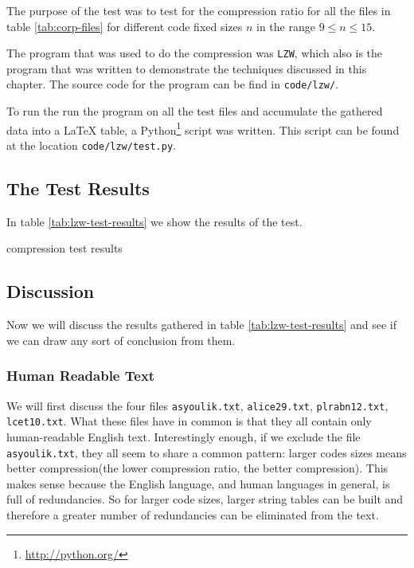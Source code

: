 The purpose of the test was to test for the compression ratio for all
the files in table \ref{tab:corp-files} for different code fixed sizes
$n$ in the range $9 \leq n \leq 15$.

The program that was used to do the compression was \verb|LZW|, which
also is the program that was written to demonstrate the techniques
discussed in this chapter. The source code for the program can be find
in \verb|code/lzw/|.

To run the run the program on all the test files and accumulate the
gathered data into a \LaTeX{} table, a Python\footnote{\url{http://python.org/}} script was written. This
script can be found at the location \verb|code/lzw/test.py|.

\subsection{The Test Results}

In table \ref{tab:lzw-test-results} we show the results of the test.

\begin{table}
  \scriptsize
  \centering
  
  \caption{\lzw compression test results}
  \label{tab:lzw-test-results}
\end{table}

\subsection{Discussion}

Now we will discuss the results gathered in table
\ref{tab:lzw-test-results} and see if we can draw any sort of
conclusion from them.

\subsubsection{Human Readable Text}

We will first discuss the four files \verb|asyoulik.txt|,
\verb|alice29.txt|, \verb|plrabn12.txt|, \verb|lcet10.txt|. What these
files have in common is that they all contain only human-readable
English text. Interestingly enough, if we exclude the file
\verb|asyoulik.txt|, they all seem to share a common pattern: larger
codes sizes means better compression(the lower compression ratio, the
better compression). This makes sense because the English language,
and human languages in general, is full of redundancies. So for larger
code sizes, larger string tables can be built and therefore a greater
number of redundancies can be eliminated from the text.

